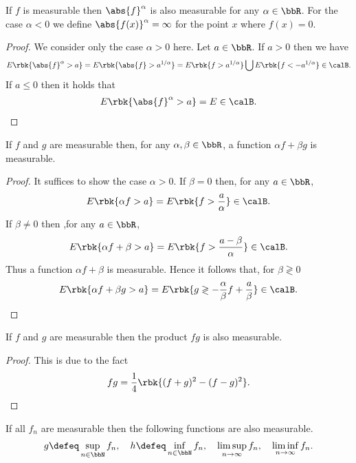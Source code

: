\documentclass[openany, a4paper, oneside]{jsbook}
\begin{document}
\begin{thm}
 If $f$ is measurable then $\abs{f}^{\alpha}$ is also measurable for any $\alpha \in \bbR$.
 For the case $\alpha < 0$ we define $\abs{f (x)}^{\alpha} = \infty$ for the point $x$ where $f (x) = 0$.
\end{thm}
\begin{proof}
 We consider only the case $\alpha > 0$ here.
 Let $a \in \bbR$.
 If $a > 0$ then we have
 \begin{align}
  E \rbk{ \abs{f}^{\alpha} > a}
  =
  E \rbk{ \abs{f} > a^{1 / \alpha}}
  =
  E \rbk{ f > a^{1 / \alpha}} \bigcup E \rbk{ f < - a^{1 / \alpha}} \in \calB.
 \end{align}
 If $a \leq 0$ then it holds that
 \begin{align}
    E \rbk{ \abs{f}^{\alpha} > a}
    =
    E \in \calB.
 \end{align}
\end{proof}
\begin{thm}
 If $f$ and $g$ are measurable then, for any $\alpha, \beta \in \bbR$, a function $\alpha f + \beta g$ is measurable.
\end{thm}
\begin{proof}
It suffices to show the case $\alpha > 0$.
If $\beta = 0$ then, for any $a \in \bbR$,
\begin{align}
 E \rbk{\alpha f > a}
 =
 E \rbk{f > \frac{a}{\alpha}} \in \calB.
\end{align}
If $\beta \neq 0$ then ,for any $a \in \bbR$,
\begin{align}
 E \rbk{\alpha f + \beta > a}
 =
 E \rbk{f > \frac{a - \beta}{\alpha}} \in \calB.
\end{align}
Thus a function $\alpha f + \beta$ is measurable.
Hence it follows that, for $\beta \gtrless 0$
\begin{align}
 E \rbk{\alpha f + \beta g > a}
 =
 E \rbk{g \gtrless - \frac{\alpha}{\beta} f + \frac{a}{\beta}} \in \calB.
\end{align}
\end{proof}
\begin{thm}
 If $f$ and $g$ are measurable then the product $fg$ is also measurable.
\end{thm}
\begin{proof}
This is due to the fact
\begin{align}
 fg
 =
 \frac{1}{4} \rbk{(f + g)^2 - (f - g)^2}.
\end{align}
\end{proof}
\begin{thm}
 If all $f_n$ are measurable then the following functions are also measurable.
 \begin{align}
  g \defeq \sup_{n \in \bbN} f_n, \quad
  h \defeq \inf_{n \in \bbN} f_n, \quad
  \limsup_{n \to \infty} f_n, \quad
  \liminf_{n \to \infty} f_n.
 \end{align}
\end{thm}
\end{document}
